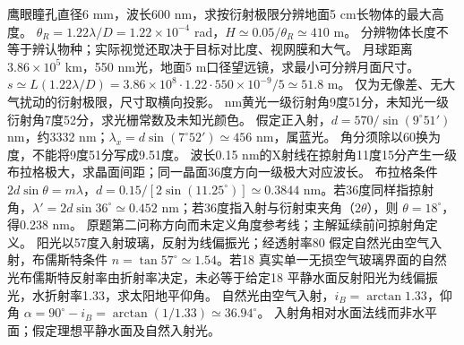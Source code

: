 \problemtext 鹰眼瞳孔直径6 mm，波长600 nm，求按衍射极限分辨地面5 cm长物体的最大高度。
\workings $\theta_R=1.22\lambda/D=1.22\times10^{-4}$ rad，$H\simeq0.05/\theta_R\simeq410$ m。
\crosscheck 分辨物体长度不等于辨认物种；实际视觉还取决于目标对比度、视网膜和大气。
\problemtext 月球距离 $3.86\times10^5$ km，550 nm光，地面5 m口径望远镜，求最小可分辨月面尺寸。
\workings $s\simeq L(1.22\lambda/D)=3.86\times10^8\cdot1.22\cdot550\times10^{-9}/5\simeq51.8$ m。
\crosscheck 仅为无像差、无大气扰动的衍射极限，尺寸取横向投影。
 nm黄光一级衍射角9度51分，未知光一级衍射角7度52分，求光栅常数及未知光颜色。
\workings 假定正入射，$d=570/\sin(9^\circ51')$ nm，约3332 nm；$\lambda_x=d\sin(7^\circ52')\simeq456$ nm，属蓝光。
\crosscheck 角分须除以60换为度，不能将9度51分写成9.51度。
\problemtext 波长0.15 nm的X射线在掠射角11度15分产生一级布拉格极大，求晶面间距；同一晶面36度方向一级极大对应波长。
\workings 布拉格条件 $2d\sin\theta=m\lambda$，$d=0.15/[2\sin(11.25^\circ)]\simeq0.3844$ nm。若36度同样指掠射角，$\lambda'=2d\sin36^\circ\simeq0.452$ nm；若36度指入射与衍射束夹角（$2\theta$），则 $\theta=18^\circ$，得0.238 nm。
\crosscheck 原题第二问称方向而未定义角度参考线；主解延续前问掠射角定义。
\problemtext 阳光以57度入射玻璃，反射为线偏振光；经透射率80%
\workings 假定自然光由空气入射，布儒斯特条件 $n=\tan57^\circ\simeq1.54$。若18%
\crosscheck 真实单一无损空气玻璃界面的自然光布儒斯特反射率由折射率决定，未必等于给定18%
\problemtext 平静水面反射阳光为线偏振光，水折射率1.33，求太阳地平仰角。
\workings 自然光由空气入射，$i_B=\arctan1.33$，仰角 $\alpha=90^\circ-i_B=\arctan(1/1.33)\simeq36.94^\circ$。
\crosscheck 入射角相对水面法线而非水平面；假定理想平静水面及自然入射光。
